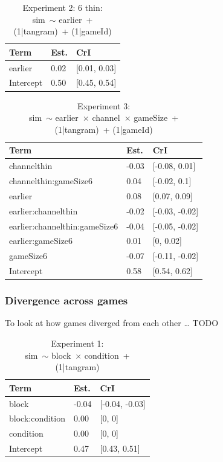 \documentclass[
  english,
  a4paper,
]{article}
\begin{document}
\begin{table}[h!]

\caption{\label{tab:unnamed-chunk-12}Experiment 2: 6 thin:\\ sim~$\sim$ earlier~+ (1|tangram)~+ (1|gameId)}
\centering
\begin{tabular}[t]{lll}
\toprule
Term & Est. & CrI\\
\midrule
earlier & 0.02 & {}[0.01, 0.03]\\
Intercept & 0.50 & {}[0.45, 0.54]\\
\bottomrule
\end{tabular}
\end{table}

\begin{table}[h!]

\caption{\label{tab:unnamed-chunk-12}Experiment 3:\\ sim~$\sim$ earlier~$\times$ channel~$\times$ gameSize~+ (1|tangram)~+ (1|gameId)}
\centering
\begin{tabular}[t]{lll}
\toprule
Term & Est. & CrI\\
\midrule
channelthin & -0.03 & {}[-0.08, 0.01]\\
channelthin:gameSize6 & 0.04 & {}[-0.02, 0.1]\\
earlier & 0.08 & {}[0.07, 0.09]\\
earlier:channelthin & -0.02 & {}[-0.03, -0.02]\\
earlier:channelthin:gameSize6 & -0.04 & {}[-0.05, -0.02]\\
\addlinespace
earlier:gameSize6 & 0.01 & {}[0, 0.02]\\
gameSize6 & -0.07 & {}[-0.11, -0.02]\\
Intercept & 0.58 & {}[0.54, 0.62]\\
\bottomrule
\end{tabular}
\end{table}

\pagebreak

\hypertarget{divergence-across-games}{%
\subsubsection{Divergence across games}\label{divergence-across-games}}

To look at how games diverged from each other \ldots{} TODO

\begin{table}[h!]

\caption{\label{tab:unnamed-chunk-13}Experiment 1:\\ sim~$\sim$ block~$\times$ condition~+ (1|tangram)}
\centering
\begin{tabular}[t]{lll}
\toprule
Term & Est. & CrI\\
\midrule
block & -0.04 & {}[-0.04, -0.03]\\
block:condition & 0.00 & {}[0, 0]\\
condition & 0.00 & {}[0, 0]\\
Intercept & 0.47 & {}[0.43, 0.51]\\
\bottomrule
\end{tabular}
\end{table}
\end{document}
